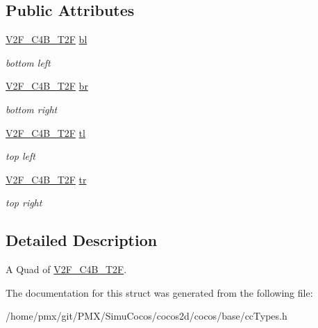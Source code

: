\subsection*{Public Attributes}
\begin{DoxyCompactItemize}
\item 
\mbox{\label{structV2F__C4B__T2F__Quad_a4578a66ca7ac3807f0fd844eedc17aea}} 
\hyperlink{structV2F__C4B__T2F}{V2\+F\+\_\+\+C4\+B\+\_\+\+T2F} \hyperlink{structV2F__C4B__T2F__Quad_a4578a66ca7ac3807f0fd844eedc17aea}{bl}
\begin{DoxyCompactList}\small\item\em bottom left \end{DoxyCompactList}\item 
\mbox{\label{structV2F__C4B__T2F__Quad_a44f594ab01dc474773cbd56006b01ed3}} 
\hyperlink{structV2F__C4B__T2F}{V2\+F\+\_\+\+C4\+B\+\_\+\+T2F} \hyperlink{structV2F__C4B__T2F__Quad_a44f594ab01dc474773cbd56006b01ed3}{br}
\begin{DoxyCompactList}\small\item\em bottom right \end{DoxyCompactList}\item 
\mbox{\label{structV2F__C4B__T2F__Quad_ab189c9256a49c5181195dd4440f39eb4}} 
\hyperlink{structV2F__C4B__T2F}{V2\+F\+\_\+\+C4\+B\+\_\+\+T2F} \hyperlink{structV2F__C4B__T2F__Quad_ab189c9256a49c5181195dd4440f39eb4}{tl}
\begin{DoxyCompactList}\small\item\em top left \end{DoxyCompactList}\item 
\mbox{\label{structV2F__C4B__T2F__Quad_a905608dab65991c66e7018ebe7e61141}} 
\hyperlink{structV2F__C4B__T2F}{V2\+F\+\_\+\+C4\+B\+\_\+\+T2F} \hyperlink{structV2F__C4B__T2F__Quad_a905608dab65991c66e7018ebe7e61141}{tr}
\begin{DoxyCompactList}\small\item\em top right \end{DoxyCompactList}\end{DoxyCompactItemize}


\subsection{Detailed Description}
A Quad of \hyperlink{structV2F__C4B__T2F}{V2\+F\+\_\+\+C4\+B\+\_\+\+T2F}. 

The documentation for this struct was generated from the following file\+:\begin{DoxyCompactItemize}
\item 
/home/pmx/git/\+P\+M\+X/\+Simu\+Cocos/cocos2d/cocos/base/cc\+Types.\+h\end{DoxyCompactItemize}
